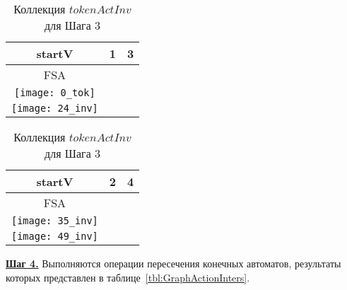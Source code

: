 \documentclass[10pt, conference, compsocconf]{IEEEtran}
\begin{document}
\begin{table}[t]
  \centering
  \begin{tabular}{| c | c | c | }
    \hline
    startV & 1 & 3  \\ \hline
    FSA 
    &
    \begin{minipage}{.15\textwidth}
    \vspace{1 mm} \\
      \texttt{[image: 0\_tok]}
    \end{minipage}
    &
    \begin{minipage}{.15\textwidth}
    \vspace{1 mm} \\
      \texttt{[image: 24\_inv]}
    \end{minipage}
    \\ \hline
   \end{tabular}
  
  \vspace{2 mm}
  \begin{tabular}{ | c | c | c | }
  \hline
    startV & 2 & 4 \\ \hline
    FSA
    &
    \begin{minipage}{.15\textwidth}
    \vspace{1 mm} \\
      \texttt{[image: 35\_inv]}
    \end{minipage}
    & 
    \begin{minipage}{.15\textwidth}
    \vspace{1 mm} \\
      \texttt{[image: 49\_inv]}
    \end{minipage}    
    \\ \hline
  \end{tabular}
  \caption{Коллекция $tokenActInv$ для Шага 3}
  \label{tbl:GraphActionInv}
\end{table}

\textbf{\underline{Шаг 4.}} Выполняются операции пересечения конечных автоматов, результаты которых представлен в таблице~\ref{tbl:GraphActionInters}.
\end{document}
